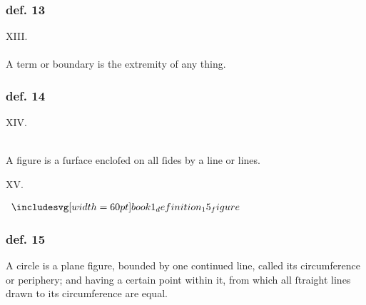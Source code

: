 \hfill

\begin{minipage}{0.1\textwidth}
  \phantom{}
\end{minipage}%
\begin{minipage}{0.8\textwidth}
  \subsubsection{def. 13}
  \begin{center}
    XIII.\label{book1def13}\\
    \hfill\\
    A term or boundary is the extremity of any thing.
  \end{center}
  \subsubsection{def. 14}
  \begin{center}
    XIV.\label{book1def14}\\
    \hfill\\
    \raggedright A figure is a ſurface encloſed on all ſides by a line or lines.
  \end{center}
\end{minipage}%
\begin{minipage}{0.1\textwidth}
  \phantom{}
\end{minipage}%

\hfill

\begin{center}
  XV.\label{book1def15}\\
\end{center}
\begin{minipage}{0.33\textwidth}
  \begin{center}
    $\img[0][0][60]{book1_definition_15_figure}$
  \end{center}
\end{minipage}%
\begin{minipage}{0.67\textwidth}
  \subsubsection{def. 15}
  \begin{center}
    \raggedright A circle is a plane figure, bounded by one continued line, called its circumference or periphery; and having a certain point within it, from which all ſtraight lines drawn to its circumference are equal.
  \end{center}
\end{minipage}

